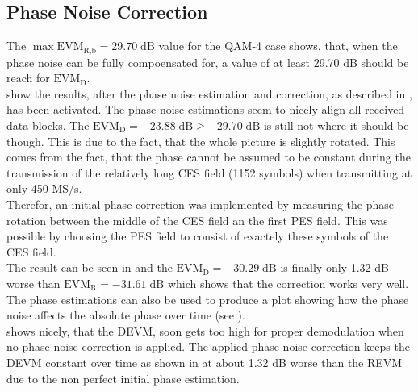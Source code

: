 \subsection{Phase Noise Correction}
\label{sec:res_450_phase}
The $\max \text{EVM}_\text{R,b} = 29.70 \;\text{dB}$ value for the
\gls{QAM}-4 case shows, that, when the phase noise can be fully compoensated
for, a value of at least 29.70 dB should be reach for $\text{EVM}_\text{D}$. \\

 show the results, after the phase noise
estimation and correction, as described in , has been
activated. The phase noise estimations seem to nicely align all received
data blocks.
The $\text{EVM}_\text{D} = -23.88 \;\text{dB} \geq -29.70 \;\text{dB}$ is still
not where it should be though. This is due to the fact, that the whole
picture is slightly rotated. This comes from the fact, that the phase cannot
be assumed to be constant during the transmission of the relatively
long \gls{CES} field (1152 symbols) when transmitting at only 450 MS/s. \\

Therefor, an initial phase correction was implemented by measuring the phase
rotation between the middle of the \gls{CES} field an the first \gls{PES}
field. This was possible by choosing the \gls{PES} field to consist
of exactely these symbols of the \gls{CES} field. \\

The result can be seen in  and the
$\text{EVM}_\text{D} = -30.29 \;\text{dB}$ is finally only 1.32 dB worse than
$\text{EVM}_\text{R} = -31.61 \;\text{dB}$ which shows that the correction
works very well. \\

The phase estimations can also be used to produce a plot showing how the
phase noise affects the absolute phase over time
(see ). \\

 shows nicely, that the \gls{DEVM},
soon gets too high for proper demodulation when no phase noise correction is
applied.
The applied phase noise correction keeps the \gls{DEVM} constant over time
as shown in  at about 1.32 dB
worse than the \gls{REVM} due to the non perfect initial phase
estimation. \\


